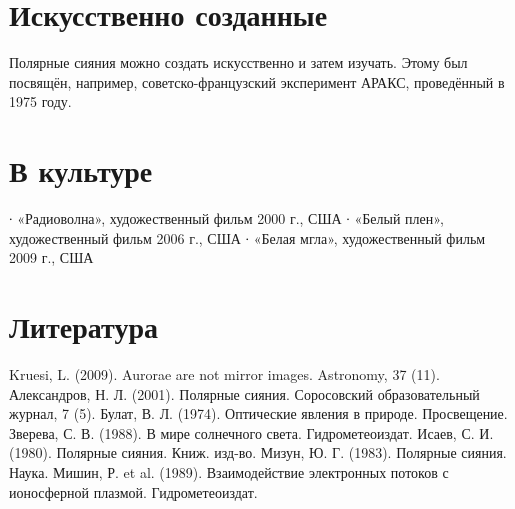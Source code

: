 \documentclass[a4paper,14pt]{article}
\begin{document}
\section{Искусственно созданные}
Полярные сияния можно создать искусственно и затем изучать. Этому был посвящён, например, советско-французский эксперимент АРАКС,
проведённый в 1975 году.

\section{В культуре}
∙ «Радиоволна», художественный фильм 2000 г., США
∙ «Белый плен», художественный фильм 2006 г., США
∙ «Белая мгла», художественный фильм 2009 г., США

\section{Литература}
Kruesi, L. (2009). Aurorae are not mirror images. Astronomy, 37 (11).
Александров, Н. Л. (2001). Полярные сияния. Соросовский образовательный журнал, 7 (5).
Булат, В. Л. (1974). Оптические явления в природе. Просвещение.
Зверева, С. В. (1988). В мире солнечного света. Гидрометеоиздат.
Исаев, С. И. (1980). Полярные сияния. Книж. изд-во.
Мизун, Ю. Г. (1983). Полярные сияния. Наука.
Мишин, Р. et al. (1989). Взаимодействие электронных потоков с ионосферной плазмой. Гидрометеоиздат.
\end{document}
